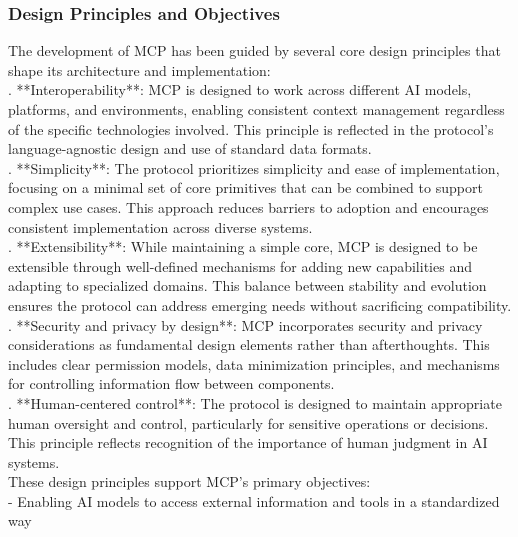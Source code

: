 \subsubsection{Design Principles and Objectives}
The development of MCP has been guided by several core design principles that shape its architecture and implementation:\\ . **Interoperability**: MCP is designed to work across different AI models, platforms, and environments, enabling consistent context management regardless of the specific technologies involved. This principle is reflected in the protocol's language-agnostic design and use of standard data formats.\\ . **Simplicity**: The protocol prioritizes simplicity and ease of implementation, focusing on a minimal set of core primitives that can be combined to support complex use cases. This approach reduces barriers to adoption and encourages consistent implementation across diverse systems.\\ . **Extensibility**: While maintaining a simple core, MCP is designed to be extensible through well-defined mechanisms for adding new capabilities and adapting to specialized domains. This balance between stability and evolution ensures the protocol can address emerging needs without sacrificing compatibility.\\ . **Security and privacy by design**: MCP incorporates security and privacy considerations as fundamental design elements rather than afterthoughts. This includes clear permission models, data minimization principles, and mechanisms for controlling information flow between components.\\ . **Human-centered control**: The protocol is designed to maintain appropriate human oversight and control, particularly for sensitive operations or decisions. This principle reflects recognition of the importance of human judgment in AI systems.\\ \newline
These design principles support MCP's primary objectives:\\ \newline
- Enabling AI models to access external information and tools in a standardized way\\ \newline
